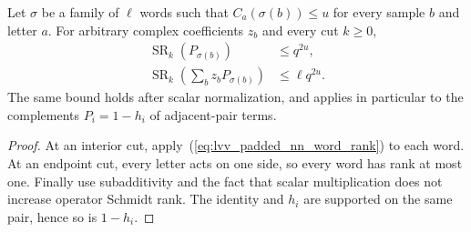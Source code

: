\begin{lemma}
    \label{thm:lvv_padded_nn_sample_rank}
    \leanok
    Let $\sigma$ be a family of $\ell$ words such that
    $C_a(\sigma(b))\le u$ for every sample $b$ and letter $a$.
    For arbitrary complex coefficients $z_b$ and every cut $k\ge0$,
    \begin{align}
        \operatorname{SR}_k(P_{\sigma(b)})
        &\le q^{2u},\\
        \operatorname{SR}_k\left(\sum_b z_bP_{\sigma(b)}\right)
        &\le \ell q^{2u}.
        \label{eq:lvv_padded_nn_sample_rank}
    \end{align}
    The same bound holds after scalar normalization, and applies in
    particular to the complements $P_i=1-h_i$ of adjacent-pair terms.
\end{lemma}
\begin{proof}\leanok
    At an interior cut, apply~(\ref{eq:lvv_padded_nn_word_rank}) to each word.
    At an endpoint cut, every letter acts on one side, so every word has
    rank at most one. Finally use subadditivity and the fact that scalar
    multiplication does not increase operator Schmidt rank. The identity
    and $h_i$ are supported on the same pair, hence so is $1-h_i$.
\end{proof}

